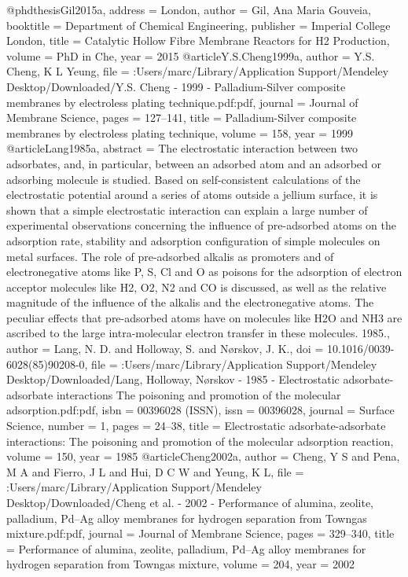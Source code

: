 @phdthesis{Gil2015a,
address = {London},
author = {Gil, Ana Maria Gouveia},
booktitle = {Department of Chemical Engineering},
publisher = {Imperial College London},
title = {{Catalytic Hollow Fibre Membrane Reactors for H2 Production}},
volume = {PhD in Che},
year = {2015}
}
@article{Y.S.Cheng1999a,
author = {{Y.S. Cheng}, K L Yeung},
file = {:Users/marc/Library/Application Support/Mendeley Desktop/Downloaded/Y.S. Cheng - 1999 - Palladium-Silver composite membranes by electroless plating technique.pdf:pdf},
journal = {Journal of Membrane Science},
pages = {127--141},
title = {{Palladium-Silver composite membranes by electroless plating technique}},
volume = {158},
year = {1999}
}
@article{Lang1985a,
abstract = {The electrostatic interaction between two adsorbates, and, in particular, between an adsorbed atom and an adsorbed or adsorbing molecule is studied. Based on self-consistent calculations of the electrostatic potential around a series of atoms outside a jellium surface, it is shown that a simple electrostatic interaction can explain a large number of experimental observations concerning the influence of pre-adsorbed atoms on the adsorption rate, stability and adsorption configuration of simple molecules on metal surfaces. The role of pre-adsorbed alkalis as promoters and of electronegative atoms like P, S, Cl and O as poisons for the adsorption of electron acceptor molecules like H2, O2, N2 and CO is discussed, as well as the relative magnitude of the influence of the alkalis and the electronegative atoms. The peculiar effects that pre-adsorbed atoms have on molecules like H2O and NH3 are ascribed to the large intra-molecular electron transfer in these molecules. {\textcopyright} 1985.},
author = {Lang, N. D. and Holloway, S. and N{\o}rskov, J. K.},
doi = {10.1016/0039-6028(85)90208-0},
file = {:Users/marc/Library/Application Support/Mendeley Desktop/Downloaded/Lang, Holloway, N{\o}rskov - 1985 - Electrostatic adsorbate-adsorbate interactions The poisoning and promotion of the molecular adsorption.pdf:pdf},
isbn = {00396028 (ISSN)},
issn = {00396028},
journal = {Surface Science},
number = {1},
pages = {24--38},
title = {{Electrostatic adsorbate-adsorbate interactions: The poisoning and promotion of the molecular adsorption reaction}},
volume = {150},
year = {1985}
}
@article{Cheng2002a,
author = {Cheng, Y S and Pena, M A and Fierro, J L and Hui, D C W and Yeung, K L},
file = {:Users/marc/Library/Application Support/Mendeley Desktop/Downloaded/Cheng et al. - 2002 - Performance of alumina, zeolite, palladium, Pd–Ag alloy membranes for hydrogen separation from Towngas mixture.pdf:pdf},
journal = {Journal of Membrane Science},
pages = {329--340},
title = {{Performance of alumina, zeolite, palladium, Pd–Ag alloy membranes for hydrogen separation from Towngas mixture}},
volume = {204},
year = {2002}
}
